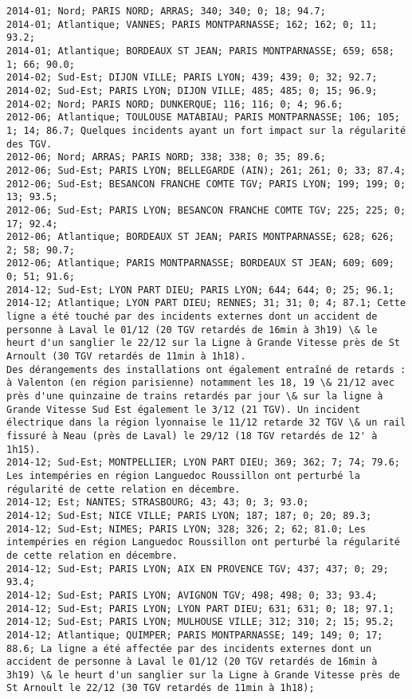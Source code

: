 \documentclass{article}
\begin{document}
\begin{Verbatim}[commandchars=\\\{\}]
2014-01; Nord; PARIS NORD; ARRAS; 340; 340; 0; 18; 94.7; 
2014-01; Atlantique; VANNES; PARIS MONTPARNASSE; 162; 162; 0; 11; 93.2; 
2014-01; Atlantique; BORDEAUX ST JEAN; PARIS MONTPARNASSE; 659; 658; 1; 66; 90.0; 
2014-02; Sud-Est; DIJON VILLE; PARIS LYON; 439; 439; 0; 32; 92.7; 
2014-02; Sud-Est; PARIS LYON; DIJON VILLE; 485; 485; 0; 15; 96.9; 
2014-02; Nord; PARIS NORD; DUNKERQUE; 116; 116; 0; 4; 96.6; 
2012-06; Atlantique; TOULOUSE MATABIAU; PARIS MONTPARNASSE; 106; 105; 1; 14; 86.7; Quelques incidents ayant un fort impact sur la régularité des TGV.
2012-06; Nord; ARRAS; PARIS NORD; 338; 338; 0; 35; 89.6; 
2012-06; Sud-Est; PARIS LYON; BELLEGARDE (AIN); 261; 261; 0; 33; 87.4; 
2012-06; Sud-Est; BESANCON FRANCHE COMTE TGV; PARIS LYON; 199; 199; 0; 13; 93.5; 
2012-06; Sud-Est; PARIS LYON; BESANCON FRANCHE COMTE TGV; 225; 225; 0; 17; 92.4; 
2012-06; Atlantique; BORDEAUX ST JEAN; PARIS MONTPARNASSE; 628; 626; 2; 58; 90.7; 
2012-06; Atlantique; PARIS MONTPARNASSE; BORDEAUX ST JEAN; 609; 609; 0; 51; 91.6; 
2014-12; Sud-Est; LYON PART DIEU; PARIS LYON; 644; 644; 0; 25; 96.1; 
2014-12; Atlantique; LYON PART DIEU; RENNES; 31; 31; 0; 4; 87.1; Cette ligne a été touché par des incidents externes dont un accident de personne à Laval le 01/12 (20 TGV retardés de 16min à 3h19) \& le heurt d'un sanglier le 22/12 sur la Ligne à Grande Vitesse près de St Arnoult (30 TGV retardés de 11min à 1h18).
Des dérangements des installations ont également entraîné de retards : à Valenton (en région parisienne) notamment les 18, 19 \& 21/12 avec près d'une quinzaine de trains retardés par jour \& sur la ligne à Grande Vitesse Sud Est également le 3/12 (21 TGV). Un incident électrique dans la région lyonnaise le 11/12 retarde 32 TGV \& un rail fissuré à Neau (près de Laval) le 29/12 (18 TGV retardés de 12' à 1h15).
2014-12; Sud-Est; MONTPELLIER; LYON PART DIEU; 369; 362; 7; 74; 79.6; Les intempéries en région Languedoc Roussillon ont perturbé la régularité de cette relation en décembre.
2014-12; Est; NANTES; STRASBOURG; 43; 43; 0; 3; 93.0; 
2014-12; Sud-Est; NICE VILLE; PARIS LYON; 187; 187; 0; 20; 89.3; 
2014-12; Sud-Est; NIMES; PARIS LYON; 328; 326; 2; 62; 81.0; Les intempéries en région Languedoc Roussillon ont perturbé la régularité de cette relation en décembre.
2014-12; Sud-Est; PARIS LYON; AIX EN PROVENCE TGV; 437; 437; 0; 29; 93.4; 
2014-12; Sud-Est; PARIS LYON; AVIGNON TGV; 498; 498; 0; 33; 93.4; 
2014-12; Sud-Est; PARIS LYON; LYON PART DIEU; 631; 631; 0; 18; 97.1; 
2014-12; Sud-Est; PARIS LYON; MULHOUSE VILLE; 312; 310; 2; 15; 95.2; 
2014-12; Atlantique; QUIMPER; PARIS MONTPARNASSE; 149; 149; 0; 17; 88.6; La ligne a été affectée par des incidents externes dont un accident de personne à Laval le 01/12 (20 TGV retardés de 16min à 3h19) \& le heurt d'un sanglier sur la Ligne à Grande Vitesse près de St Arnoult le 22/12 (30 TGV retardés de 11min à 1h18);

\end{Verbatim}
\end{document}

